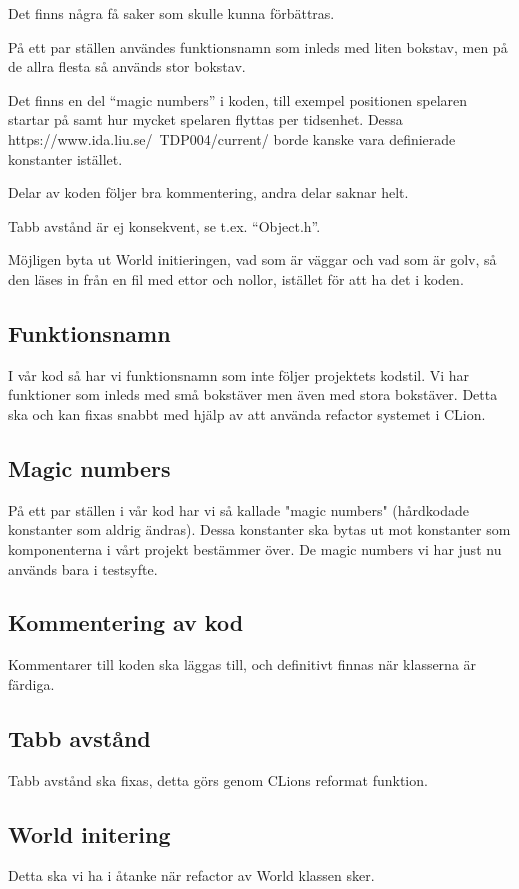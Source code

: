 \documentclass{template}
\begin{document}
Det finns några få saker som skulle kunna förbättras.

På ett par ställen användes funktionsnamn som inleds med liten bokstav, men på de allra flesta så används stor bokstav.

Det finns en del “magic numbers” i koden, till exempel positionen spelaren startar på samt hur mycket spelaren flyttas per tidsenhet. Dessa https://www.ida.liu.se/~TDP004/current/ borde kanske vara definierade konstanter istället.

Delar av koden följer bra kommentering, andra delar saknar helt.

Tabb avstånd är ej konsekvent, se t.ex. “Object.h”.

Möjligen byta ut World initieringen, vad som är väggar och vad som är golv, så den läses in från en fil med ettor och nollor, istället för att ha det i koden.


\subsection{Funktionsnamn}
I vår kod så har vi funktionsnamn som inte följer projektets kodstil. Vi har funktioner som inleds med små bokstäver men även med stora bokstäver. Detta ska och kan fixas snabbt med hjälp av att använda refactor systemet i CLion.

\subsection{Magic numbers}
På ett par ställen i vår kod har vi så kallade "magic numbers" (hårdkodade konstanter som aldrig ändras). Dessa konstanter ska bytas ut mot konstanter som komponenterna i vårt projekt bestämmer över. De magic numbers vi har just nu används bara i testsyfte.

\subsection{Kommentering av kod}
Kommentarer till koden ska läggas till, och definitivt finnas när klasserna är färdiga.

\subsection{Tabb avstånd}
Tabb avstånd ska fixas, detta görs genom CLions reformat funktion.

\subsection{World initering}
Detta ska vi ha i åtanke när refactor av World klassen sker.
\end{document}
